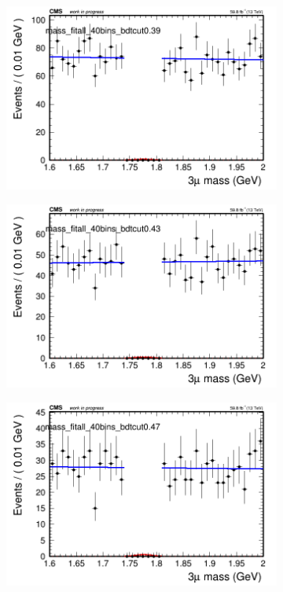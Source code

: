 \begin{figure}[H]
\begin{subfigure}{0.2\textwidth}
        \caption{}
    \end{subfigure}
    \begin{subfigure}{0.2\textwidth}
        \includegraphics[width=\textwidth]{unfixed_exp/plots/all/massfit_all_40bins_bdtcut0.39.png}
        \caption{}
    \end{subfigure}
    \begin{subfigure}{0.2\textwidth}
        \includegraphics[width=\textwidth]{unfixed_exp/plots/all/massfit_all_40bins_bdtcut0.43.png}
        \caption{}
    \end{subfigure}
    \begin{subfigure}{0.2\textwidth}
        \includegraphics[width=\textwidth]{unfixed_exp/plots/all/massfit_all_40bins_bdtcut0.47.png}

\end{subfigure}
\end{figure}
